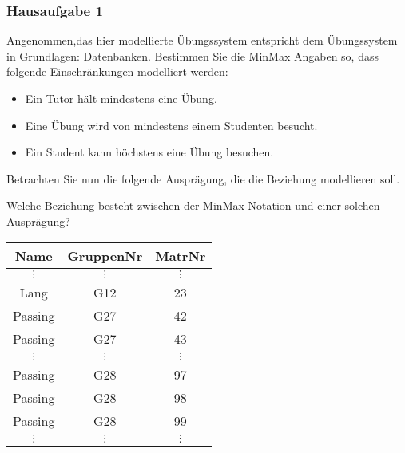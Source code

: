 \begin{frame}
	\frametitle{Hausaufgabe 1}
	\vspace{0.25cm}

	\begin{multicols}{2}
		Angenommen,das hier modellierte Übungssystem entspricht dem Übungssystem in Grundlagen:
		Datenbanken. Bestimmen Sie die MinMax Angaben so, dass folgende Einschränkungen
		modelliert werden:
		\begin{itemize}
			\item Ein Tutor hält mindestens eine Übung.
			\item Eine Übung wird von mindestens einem Studenten besucht.
			\item Ein Student kann höchstens eine Übung besuchen.
		\end{itemize}
		Betrachten Sie nun die folgende Ausprägung, die die Beziehung modellieren soll.

		Welche Beziehung besteht zwischen der MinMax Notation und einer solchen
		Ausprägung?

		\vfill\columnbreak

		\begin{table}[]
			\begin{tabular}{c|c|c}
				Name         & GruppenNr    & MatrNr       \\ \hline
				\( \vdots \) & \( \vdots \) & \( \vdots \) \\
				Lang         & G12          & 23           \\
				Passing      & G27          & 42           \\
				Passing      & G27          & 43           \\
				\( \vdots \) & \( \vdots \) & \( \vdots \) \\
				Passing      & G28          & 97           \\
				Passing      & G28          & 98           \\
				Passing      & G28          & 99           \\
				\( \vdots \) & \( \vdots \) & \( \vdots \) \\
			\end{tabular}
		\end{table}

	\end{multicols}
\end{frame}

